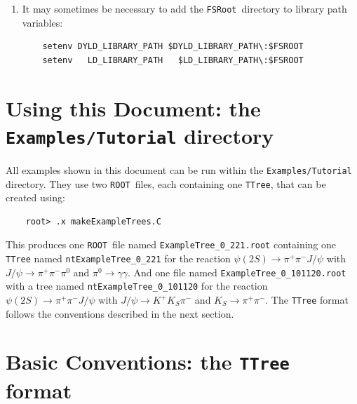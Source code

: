 \documentclass[11pt]{article}
\newcommand{\FSR}{{\tt FSRoot}}
\newcommand{\ROOT}{{\tt ROOT}}
\begin{document}
\begin{enumerate}
\item It may sometimes be necessary to add the \FSR\ directory to library path variables:
\begin{verbatim}
    setenv DYLD_LIBRARY_PATH $DYLD_LIBRARY_PATH\:$FSROOT
    setenv   LD_LIBRARY_PATH   $LD_LIBRARY_PATH\:$FSROOT
\end{verbatim}

\end{enumerate}


\section{Using this Document: the {\tt Examples/Tutorial} directory}
\label{sec:tutorial}

All examples shown in this document can be run within the {\tt Examples/Tutorial} directory.  They use two \ROOT\ files, each containing one {\tt TTree}, that can be created using:
\begin{verbatim}
    root> .x makeExampleTrees.C
\end{verbatim}
This produces one \ROOT\ file named {\tt ExampleTree\_0\_221.root} containing one {\tt TTree} named {\tt ntExampleTree\_0\_221} for the reaction
$\psi(2S)\to\pi^+\pi^-J/\psi$ with $J/\psi \to \pi^+\pi^-\pi^0$ and $\pi^0 \to \gamma \gamma$.  
And one file named {\tt ExampleTree\_0\_101120.root} with a tree named {\tt ntExampleTree\_0\_101120} for the reaction 
$\psi(2S)\to\pi^+\pi^-J/\psi$ with $J/\psi \to K^+K_S\pi^-$ and $K_S \to \pi^+\pi^-$.  The {\tt TTree} format follows the conventions described in the next section.

\section{Basic Conventions: the {\tt TTree} format}
\label{sec:conventions}
\end{document}
